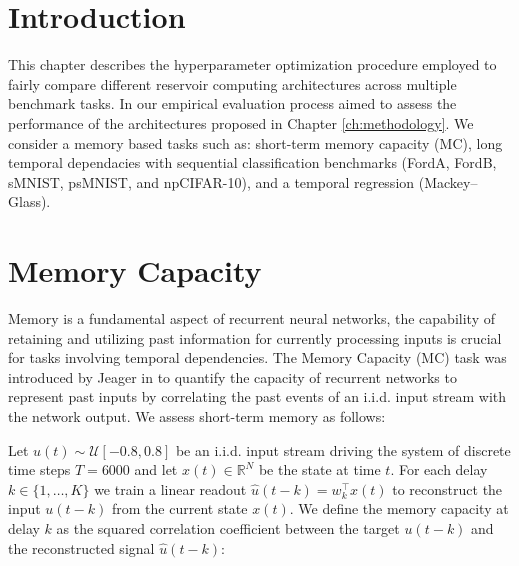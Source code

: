 

\newcommand{\DCR}{DeepCycleESN}
\newcommand{\DCRalt}{$\mathrm{DeepESN_{Cycle}$}}
\newcommand{\DAR}{DeepAntisymESN}
\newcommand{\DARalt}{$\mat/\hrm{DeepESN_{Antisym}$}}
\newcommand{\DCO}{DeepCycleRON}
\newcommand{\DCOalt}{$\mathrm{DeepRON_{Cycle}$}}
\newcommand{\DAO}{DeepAntisymRON}
\newcommand{\DAOalt}{$\mathrm{DeepRON_{Antisym}$}}

\label{ch:experiments}
\section{Introduction}
This chapter describes the hyperparameter optimization procedure employed to fairly compare different reservoir computing architectures across multiple benchmark tasks. 
In our empirical evaluation process aimed to assess the performance of the architectures proposed in Chapter \ref{ch:methodology}.
We consider a memory based tasks such as: short-term memory capacity (MC), long temporal dependacies with sequential classification benchmarks (FordA, FordB, sMNIST, psMNIST, and npCIFAR-10),
 and a temporal regression (Mackey--Glass).

\section{Memory Capacity}
\label{sec:exp:mc}
Memory is a fundamental aspect of recurrent neural networks, the capability of retaining and utilizing past information for currently processing inputs
is crucial for tasks involving temporal dependencies.
The Memory Capacity (MC) task was introduced by Jeager in \cite{memorycapacity} to quantify the capacity of recurrent networks to represent past inputs by correlating the past events of an i.i.d. input
stream with the network output. We assess short-term memory as follows:

Let $u(t)\sim \mathcal{U}[-0.8,0.8]$ be an i.i.d. input stream driving the system of discrete time steps $T=6000$ and let $x(t)\in\mathbb{R}^N$ be the state at time $t$.
For each delay $k\in\{1,\dots,K\}$ we train a linear readout $\hat{u}(t-k) = w_k^\top x(t)$ 
to reconstruct the input $u(t-k)$ from the current state $x(t)$.
 We define the memory capacity at delay $k$ as the squared correlation coefficient between the target $u(t-k)$ and the reconstructed signal $\hat{u}(t-k)$:

